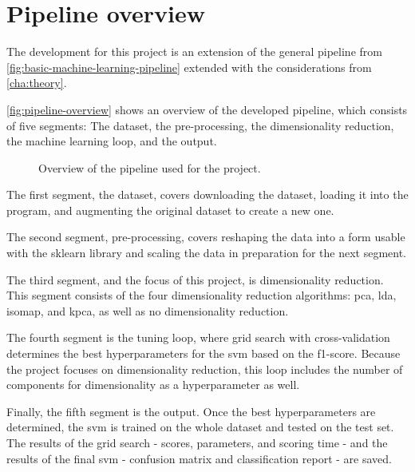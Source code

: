 \section{Pipeline overview}\label{sec:pipeline-overview}
The development for this project is an extension of the general pipeline from \autoref{fig:basic-machine-learning-pipeline} extended with the considerations from \autoref{cha:theory}.

\autoref{fig:pipeline-overview} shows an overview of the developed pipeline, which consists of five segments: The dataset, the pre-processing, the dimensionality reduction, the machine learning loop, and the output.


\begin{figure}[b!]
    \centering
    
    \caption{Overview of the pipeline used for the project.}
    \label{fig:pipeline-overview}
\end{figure}


The first segment, the dataset, covers downloading the dataset, loading it into the program, and augmenting the original dataset to create a new one.

The second segment, pre-processing, covers reshaping the data into a form usable with the \gls{sklearn} library and scaling the data in preparation for the next segment.

The third segment, and the focus of this project, is dimensionality reduction. This segment consists of the four dimensionality reduction algorithms: \gls{pca}, \gls{lda}, \gls{isomap}, and \gls{kpca}, as well as no dimensionality reduction.

The fourth segment is the tuning loop, where grid search with cross-validation determines the best hyperparameters for the \gls{svm} based on the f1-score. Because the project focuses on dimensionality reduction, this loop includes the number of components for dimensionality as a hyperparameter as well.

Finally, the fifth segment is the output. Once the best hyperparameters are determined, the \gls{svm} is trained on the whole dataset and tested on the test set. The results of the grid search - scores, parameters, and scoring time - and the results of the final \gls{svm} - confusion matrix and classification report - are saved.
